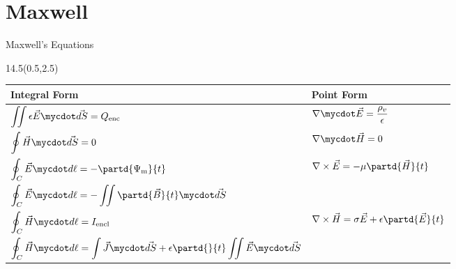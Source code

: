 \section{Maxwell}
\begin{frame}{Maxwell's Equations}
\begin{textblock}{14.5}(0.5,2.5)

\begin{center}
\begin{tabular}{| l | l |}
\hline
\textbf{Integral Form} & \textbf{Point Form}  \\\hline
 ${\displaystyle \iint \epsilon\vec{E}\mycdot \vec{dS}} = Q_{\text{enc}} $ 
 & $\nabla\mycdot\vec{E}  = \dfrac{\rho_v}{\epsilon}$   \\ \hline
${\displaystyle\oint \vec{H}\mycdot\vec{dS} } = 0 $ 
& $\nabla\mycdot\vec{H} = 0$ \\ \hline
$\begin{aligned}
\displaystyle\oint_C \vec{E}\mycdot d\ell &=-\partd{\Psi_{\text{m}}}{t} \\
\displaystyle\oint_C \vec{E}\mycdot d\ell &=  -\iint\partd{\vec{B}}{t}\mycdot \vec{dS}
\end{aligned}$
&$\begin{aligned}
\nabla\times\vec{E} &= -\mu\partd{\vec{H}}{t} \\
\end{aligned}$
\\ \hline
$\begin{aligned}
\displaystyle\oint_C\vec{H}\mycdot d\ell &= I_{\text{encl}} \\ 
\displaystyle\oint_C\vec{H}\mycdot d\ell &= \int \vec{J}\mycdot\vec{dS} 
 + \epsilon\partd{}{t}\iint\vec{E}\mycdot \vec{dS}
\end{aligned} $
& $\begin{aligned}
\nabla\times\vec{H} &= \sigma \vec{E} + \epsilon\partd{\vec{E}}{t} \\ 
 \end{aligned}$ \\ \hline
\end{tabular}
\end{center}

\end{textblock}
\end{frame}

